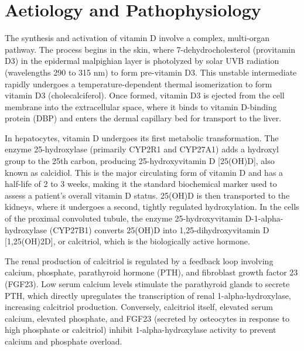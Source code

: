\section*{Aetiology and Pathophysiology}
The synthesis and activation of vitamin D involve a complex, multi-organ pathway. The process begins in the skin, where 7-dehydrocholesterol (provitamin D3) in the epidermal malpighian layer is photolyzed by solar UVB radiation (wavelengths 290 to 315 nm) to form pre-vitamin D3. This unstable intermediate rapidly undergoes a temperature-dependent thermal isomerization to form vitamin D3 (cholecalciferol). Once formed, vitamin D3 is ejected from the cell membrane into the extracellular space, where it binds to vitamin D-binding protein (DBP) and enters the dermal capillary bed for transport to the liver.

In hepatocytes, vitamin D undergoes its first metabolic transformation. The enzyme 25-hydroxylase (primarily CYP2R1 and CYP27A1) adds a hydroxyl group to the 25th carbon, producing 25-hydroxyvitamin D [25(OH)D], also known as calcidiol. This is the major circulating form of vitamin D and has a half-life of 2 to 3 weeks, making it the standard biochemical marker used to assess a patient's overall vitamin D status. 25(OH)D is then transported to the kidneys, where it undergoes a second, tightly regulated hydroxylation. In the cells of the proximal convoluted tubule, the enzyme 25-hydroxyvitamin D-1-alpha-hydroxylase (CYP27B1) converts 25(OH)D into 1,25-dihydroxyvitamin D [1,25(OH)2D], or calcitriol, which is the biologically active hormone.

The renal production of calcitriol is regulated by a feedback loop involving calcium, phosphate, parathyroid hormone (PTH), and fibroblast growth factor 23 (FGF23). Low serum calcium levels stimulate the parathyroid glands to secrete PTH, which directly upregulates the transcription of renal 1-alpha-hydroxylase, increasing calcitriol production. Conversely, calcitriol itself, elevated serum calcium, elevated phosphate, and FGF23 (secreted by osteocytes in response to high phosphate or calcitriol) inhibit 1-alpha-hydroxylase activity to prevent calcium and phosphate overload.

